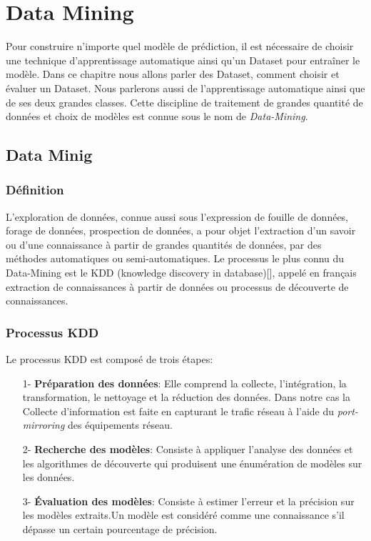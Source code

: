 \chapter{Data Mining}

\label{Chapter3} 
Pour construire n'importe quel modèle de prédiction, il est nécessaire de choisir une technique d'apprentissage automatique ainsi qu'un Dataset pour entraîner le modèle. Dans ce chapitre nous allons parler des Dataset, comment choisir et évaluer un Dataset. Nous parlerons aussi de l’apprentissage automatique ainsi que de ses deux grandes classes. Cette discipline de traitement de grandes quantité de données et choix de modèles est connue sous le nom de \textit{Data-Mining}.

\section{Data Minig}
\subsection{Définition}
L’exploration de données, connue aussi sous l’expression de fouille de données, forage de données, prospection de données, a pour objet l’extraction d’un savoir ou d’une connaissance à partir de grandes quantités de données, par des méthodes automatiques ou semi-automatiques. Le processus le plus connu du Data-Mining est le KDD (knowledge discovery in database)[\cite{14}], appelé en français extraction de connaissances à partir de données ou processus de découverte de connaissances.

\subsection{Processus KDD}
\label{KDD}
Le processus KDD est composé de trois étapes:\\
\begin{itemize}
\item[1-]\textbf{Préparation des données}: Elle comprend la collecte, l'intégration, la transformation, le nettoyage et la réduction des données. Dans notre cas la Collecte d'information est faite en capturant le trafic réseau à l'aide du \textit{port-mirroring} des équipements réseau.\\
\item[2-]\textbf{Recherche des modèles}: Consiste à appliquer l'analyse des données et les algorithmes de découverte qui produisent une énumération de modèles sur les données.\\
\item[3-]\textbf{Évaluation des modèles}: Consiste à estimer l'erreur et la précision sur les modèles extraits.Un modèle est considéré comme une connaissance s'il dépasse un certain pourcentage de précision.
\end{itemize}

